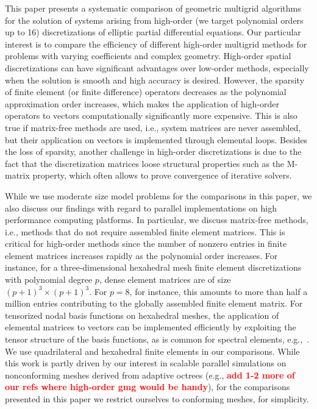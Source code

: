 \documentclass[smallcondensed,final]{svjour3}     %
\newcommand{\todo}[1]{\textcolor{red}{\bf #1}}
\begin{document}
This paper presents a systematic comparison of geometric multigrid
algorithms for the solution of systems arising from high-order (we
target polynomial orders up to 16) discretizations of elliptic partial
differential equations. Our particular interest is to compare the
efficiency of different high-order multigrid methods for problems with
varying coefficients and complex geometry.
High-order spatial discretizations can have significant advantages
over low-order methods, especially when the solution is smooth and
high accuracy is desired. However, the sparsity of finite element (or
finite difference) operators decreases as the polynomial approximation
order increases, which makes the application of high-order operators
to vectors computationally significantly more expensive. This is also
true if matrix-free methods are used, i.e., system matrices are never
assembled, but their application on vectors is implemented through
elemental loops.  Besides the loss of sparsity, another challenge in
high-order discretizations is due to the fact that the discretization
matrices loose structural properties such as the M-matrix property,
which often allows to prove convergence of iterative solvers.

While we use moderate size model problems for the comparisons in this
paper, we also discuss our findings with regard to parallel
implementations on high performance computing platforms.  In
particular, we discuss matrix-free methods, i.e., methods that do not
require assembled finite element matrices. This is critical for
high-order methods since the number of nonzero entries in finite
element matrices increases rapidly as the polynomial order
increases. For instance, for a three-dimensional hexahedral mesh
finite element discretizations with polynomial degree $p$, dense
element matrices are of size $(p+1)^3\times (p+1)^3$. For $p=8$, for
instance, this amounts to more than half a million entries
contributing to the globally assembled finite element matrix.  For
tensorized nodal basis functions on hexahedral meshes, the application
of elemental matrices to vectors can be implemented efficiently by
exploiting the tensor structure of the basis functions, as is common
for spectral elements, e.g.,~\cite{DevilleFischerMund02}. We use
quadrilateral and hexahedral finite elements in our comparisons. While
this work is partly driven by our interest in scalable parallel
simulations on nonconforming meshes derived from adaptive octrees
(e.g.,\cite{SundarBirosBursteddeEtAl12} \todo{add 1-2 more of our refs
  where high-order gmg would be handy}), for the comparisons presented
in this paper we restrict ourselves to conforming meshes, for
simplicity.
\end{document}
